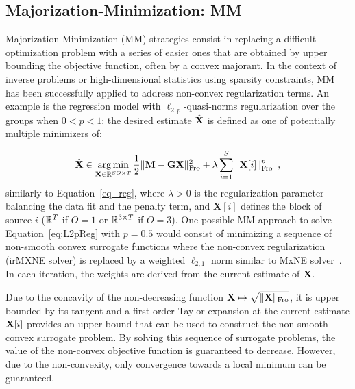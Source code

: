 \subsection{Majorization-Minimization: MM}
\label{section:MM}

Majorization-Minimization (MM) strategies consist in replacing a difficult optimization problem with a series of easier ones that are obtained by upper bounding the objective function, often by a convex majorant.
%
In the context of inverse problems or high-dimensional statistics using sparsity constraints, MM has been successfully applied to address non-convex regularization terms. An example is the regression model with $\ell_{2,p}$-quasi-norms regularization over the groups when $0<p<1$: the desired estimate $\hat{\mathbf{X}}$ is defined as one of potentially multiple minimizers of:

\begin{equation} \label{eq:L2pReg}
\hat{\mathbf{X}} \in \mathop{\mathrm{arg}\,\mathrm{min}}_{\mathbf{X}\in\mathbb{R}^{SO \times T}} \frac{1}{2} \|{\mathbf{M} - \mathbf{G} \mathbf{X}}\|_{\rm Fro}^2  + \lambda \sum_{i=1}^S \|{\mathbf{X}{[i]}}\|_{\rm Fro}^p \enspace,
\end{equation}
similarly to Equation~\eqref{eq_reg}, where $\lambda > 0$ is the regularization parameter balancing the data fit and the penalty term, and $\mathbf{X}[i]$ defines the block of source $i$ ($\mathbb{R}^T$ if $O=1$ or $\mathbb{R}^{3\times T}$ if $O=3$). One possible MM approach to solve Equation~\eqref{eq:L2pReg} with $p=0.5$ would consist of minimizing a sequence of non-smooth convex surrogate functions where the non-convex regularization (irMXNE solver) is replaced by a weighted $\ell_{2,1}$ norm similar to MxNE solver~\cite{strohmeier-etal:16}. In each iteration, the weights are derived from the current estimate of $\mathbf{X}$.

Due to the concavity of the non-decreasing function $\mathbf{X}\mapsto\sqrt{\|{\mathbf{X}}\|_{\rm Fro}}$, it is upper bounded by its tangent and a first order Taylor expansion at the current estimate $\mathbf{X}{[i]}$ provides an upper bound that can be used to construct the non-smooth convex surrogate problem. By solving this sequence of surrogate problems, the value of the non-convex objective function is guaranteed to decrease. However, due to the non-convexity, only convergence towards a local minimum can be guaranteed.

